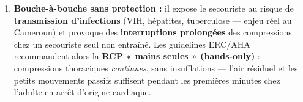 \documentclass[11pt]{article}
\begin{document}
\begin{corrige}
\begin{enumerate}
\begin{enumerate}
        \item \textbf{Poursuivre} jusqu'à : reprise d'une respiration normale/mouvements, arrivée des secours médicalisés, épuisement total ou danger.
    \end{enumerate}
    \item \textbf{Bouche-à-bouche sans protection :} il expose le secouriste au risque de \textbf{transmission d'infections} (VIH, hépatites, tuberculose — enjeu réel au Cameroun) et provoque des \textbf{interruptions prolongées} des compressions chez un secouriste seul non entraîné. Les guidelines ERC/AHA recommandent alors la \textbf{RCP « mains seules » (hands-only)} : compressions thoraciques \emph{continues}, sans insufflations — l'air résiduel et les petits mouvements passifs suffisent pendant les premières minutes chez l'adulte en arrêt d'origine cardiaque.
\end{enumerate}
\end{corrige}
\end{document}
